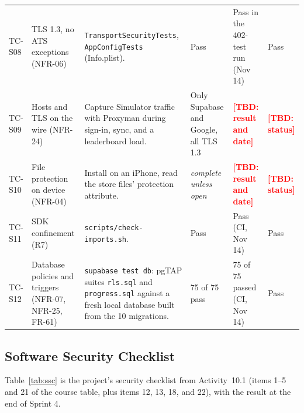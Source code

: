 \documentclass[12pt,letterpaper]{article}
\newcommand{\tbd}[1]{\textcolor{red}{\textbf{[TBD: #1]}}}
\begin{document}
\begin{xltabular}{\textwidth}{@{}L{1.2cm} L{2.4cm} Y L{2.4cm} L{2.4cm} L{1.5cm}@{}}
TC-S08 & TLS 1.3, no ATS exceptions (NFR-06) & \texttt{TransportSecurityTests}, \texttt{AppConfigTests} (Info.plist). & Pass & Pass in the 402-test run (Nov 14) & Pass \\
TC-S09 & Hosts and TLS on the wire (NFR-24) & Capture Simulator traffic with Proxyman during sign-in, sync, and a leaderboard load. & Only Supabase and Google, all TLS 1.3 & \tbd{result and date} & \tbd{status} \\
TC-S10 & File protection on device (NFR-04) & Install on an iPhone, read the store files' protection attribute. & \emph{complete unless open} & \tbd{result and date} & \tbd{status} \\
TC-S11 & SDK confinement (R7) & \texttt{scripts/check-imports.sh}. & Pass & Pass (CI, Nov 14) & Pass \\
TC-S12 & Database policies and triggers (NFR-07, NFR-25, FR-61) & \texttt{supabase test db}: pgTAP suites \texttt{rls.sql} and \texttt{progress.sql} against a fresh local database built from the 10 migrations. & 75 of 75 pass & 75 of 75 passed (CI, Nov 14) & Pass \\
\end{xltabular}

\subsection{Software Security Checklist}
Table~\ref{tab:ssc} is the project's security checklist from Activity~10.1 (items 1--5
and 21 of the course table, plus items 12, 13, 18, and 22), with the result at the end
of Sprint 4.
\end{document}
